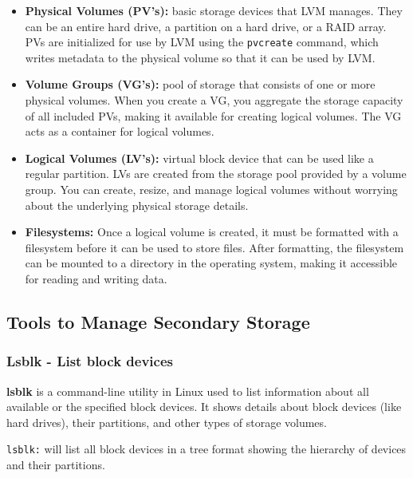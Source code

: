 \documentclass{article}
\begin{document}
\begin{itemize}
    \item \textbf{Physical Volumes (PV's):} basic storage devices that LVM manages. They can be an entire hard drive, a partition on a hard drive, or a RAID array. PVs are initialized for use by LVM using the \verb|pvcreate| command, which writes metadata to the physical volume so that it can be used by LVM.
    \item \textbf{Volume Groups (VG's):} pool of storage that consists of one or more physical volumes. When you create a VG, you aggregate the storage capacity of all included PVs, making it available for creating logical volumes. The VG acts as a container for logical volumes.
    \item \textbf{Logical Volumes (LV's):} virtual block device that can be used like a regular partition. LVs are created from the storage pool provided by a volume group. You can create, resize, and manage logical volumes without worrying about the underlying physical storage details.
    \item \textbf{Filesystems:} Once a logical volume is created, it must be formatted with a filesystem before it can be used to store files. After formatting, the filesystem can be mounted to a directory in the operating system, making it accessible for reading and writing data.
\end{itemize}

\subsection{Tools to Manage Secondary Storage}

\subsubsection{Lsblk - List block devices}
\textbf{lsblk} is a command-line utility in Linux used to list information about all available or the specified block devices. It shows details about block devices (like hard drives), their partitions, and other types of storage volumes.

\verb|lsblk:| will list all block devices in a tree format showing the hierarchy of devices and their partitions.
\end{document}
